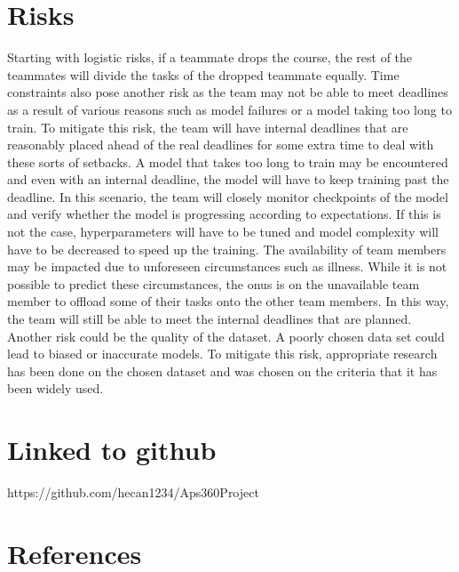 \documentclass{article} %
\begin{document}
\section{Risks }
Starting with logistic risks, if a teammate drops the course, the rest of the teammates will divide the tasks of the dropped teammate equally. Time constraints also pose another risk as the team may not be able to meet deadlines as a result of various reasons such as model failures or a model taking too long to train. To mitigate this risk, the team will have internal deadlines that are reasonably placed ahead of the real deadlines for some extra time to deal with these sorts of setbacks. A model that takes too long to train may be encountered and even with an internal deadline, the model will have to keep training past the deadline. In this scenario, the team will closely monitor checkpoints of the model and verify whether the model is progressing according to expectations. If this is not the case, hyperparameters will have to be tuned and model complexity will have to be decreased to speed up the training. The availability of team members may be impacted due to unforeseen circumstances such as illness. While it is not possible to predict these circumstances, the onus is on the unavailable team member to offload some of their tasks onto the other team members. In this way, the team will still be able to meet the internal deadlines that are planned. Another risk could be the quality of the dataset. A poorly chosen data set could lead to biased or inaccurate models. To mitigate this risk, appropriate research has been done on the chosen dataset and was chosen on the criteria that it has been widely used.

\section{Linked to github}
https://github.com/hecan1234/Aps360Project

\section{References}







\end{document}
